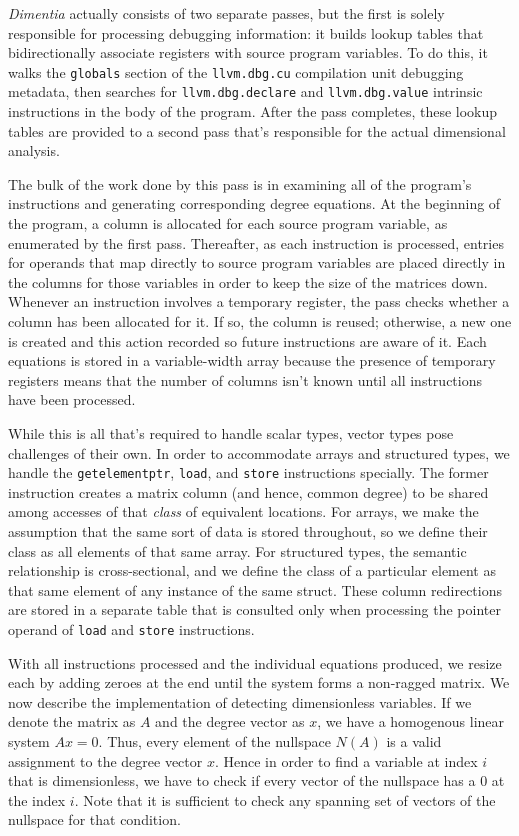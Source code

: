 \documentclass[12pt]{article}
\begin{document}
\textit{Dimentia} actually consists of two separate passes, but the first is solely responsible for processing debugging information: it builds lookup tables that bidirectionally associate registers with source program variables.
To do this, it walks the \texttt{globals} section of the \texttt{llvm.dbg.cu} compilation unit debugging metadata, then searches for \texttt{llvm.dbg.declare} and \texttt{llvm.dbg.value} intrinsic instructions in the body of the program.
After the pass completes, these lookup tables are provided to a second pass that's responsible for the actual dimensional analysis.

The bulk of the work done by this pass is in examining all of the program's instructions and generating corresponding degree equations.
At the beginning of the program, a column is allocated for each source program variable, as enumerated by the first pass.
Thereafter, as each instruction is processed, entries for operands that map directly to source program variables are placed directly in the columns for those variables in order to keep the size of the matrices down.
Whenever an instruction involves a temporary register, the pass checks whether a column has been allocated for it.
If so, the column is reused; otherwise, a new one is created and this action recorded so future instructions are aware of it.
Each equations is stored in a variable-width array because the presence of temporary registers means that the number of columns isn't known until all instructions have been processed.

While this is all that's required to handle scalar types, vector types pose challenges of their own.
In order to accommodate arrays and structured types, we handle the \texttt{getelementptr}, \texttt{load}, and \texttt{store} instructions specially.
The former instruction creates a matrix column (and hence, common degree) to be shared among accesses of that \textit{class} of equivalent locations.
For arrays, we make the assumption that the same sort of data is stored throughout, so we define their class as all elements of that same array.
For structured types, the semantic relationship is cross-sectional, and we define the class of a particular element as that same element of any instance of the same struct.
These column redirections are stored in a separate table that is consulted only when processing the pointer operand of \texttt{load} and \texttt{store} instructions.

With all instructions processed and the individual equations produced, we resize each by adding zeroes at the end until the system forms a non-ragged matrix.
We now describe the implementation of detecting dimensionless variables.
If we denote the matrix as $A$ and the degree vector as $x$, we have a homogenous linear system $Ax = 0$.
Thus, every element of the nullspace $N(A)$ is a valid assignment to the degree vector $x$.
Hence in order to find a variable at index $i$ that is dimensionless, we have to check if every vector of the nullspace has a $0$ at the index $i$.
Note that it is sufficient to check any spanning set of vectors of the nullspace for that condition.
\end{document}
